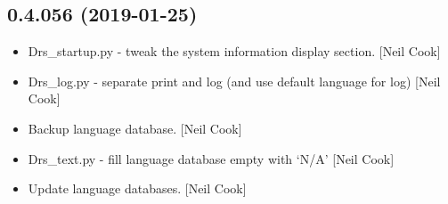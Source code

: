 \documentclass[a4paper,10pt,english]{report}
\begin{document}
\subsection{0.4.056 (2019-01-25)}
\label{\detokenize{misc/changelog:id206}}\begin{itemize}
\item {} 
Drs\_startup.py - tweak the system information display section. {[}Neil
Cook{]}

\item {} 
Drs\_log.py - separate print and log (and use default language for log)
{[}Neil Cook{]}

\item {} 
Backup language database. {[}Neil Cook{]}

\item {} 
Drs\_text.py - fill language database empty with ‘N/A’ {[}Neil Cook{]}

\item {} 
Update language databases. {[}Neil Cook{]}

\end{itemize}
\end{document}
